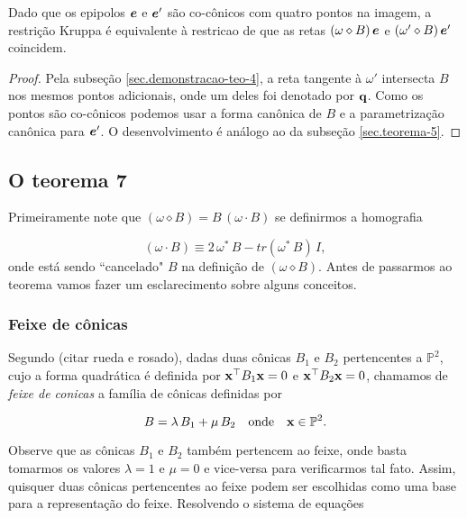 \begin{teorema}
Dado que os epipolos $\boldsymbol{e}$ e $\boldsymbol{e}'$ são co-cônicos com quatro pontos na imagem, a restrição Kruppa é equivalente à restricao de que as retas $(\omega\diamond B)\,\boldsymbol{e}$ e $(\omega'\diamond B)\,\boldsymbol{e}'$ coincidem.
\end{teorema}

\begin{proof}
Pela subseção \ref{sec.demonstracao-teo-4}, a reta tangente à $\omega'$ intersecta $B$ nos mesmos pontos adicionais, onde um deles foi denotado por ${\bf q}$. Como os pontos são co-cônicos podemos usar a forma canônica de $B$ e a parametrização canônica para $\boldsymbol{e}'$. O desenvolvimento é análogo ao da subseção \ref{sec.teorema-5}.
\end{proof}

\subsection{O teorema 7}


Primeiramente note que $(\omega \diamond B) = B\,(\omega \cdot B)$ se definirmos a homografia

\begin{equation}
(\omega \cdot B) \equiv 2\,\omega^*\,B - tr(\omega^*\,B)\,I,
\end{equation}
onde está sendo ``cancelado" $B$ na definição de $(\omega \diamond B)$. Antes de passarmos ao teorema vamos fazer um esclarecimento sobre alguns conceitos. 

\subsubsection{Feixe de cônicas}\label{sec.feixe-conicas}

Segundo (citar rueda e rosado), dadas duas cônicas $B_1$ e $B_2$ pertencentes a $\mathbb{P}^2$, cujo a forma quadrática é definida por $\mathbf{x}^\top B_1\mathbf{x}=0$ e $\mathbf{x}^\top B_2\mathbf{x}=0$, chamamos de \textit{feixe de conicas} a família de cônicas definidas por

\begin{equation}\label{eq.B-combinacao-B1-B2}
B=\lambda\,B_1+\mu\,B_2\quad\text{onde}\quad\mathbf{x}\in\mathbb{P}^2.
\end{equation}

Observe que as cônicas $B_1$ e $B_2$ também pertencem ao feixe, onde basta tomarmos os valores $\lambda=1$ e $\mu=0$ e vice-versa para verificarmos tal fato. Assim, quisquer duas cônicas pertencentes ao feixe podem ser escolhidas como uma base para a representação do feixe. Resolvendo o sistema de equações

